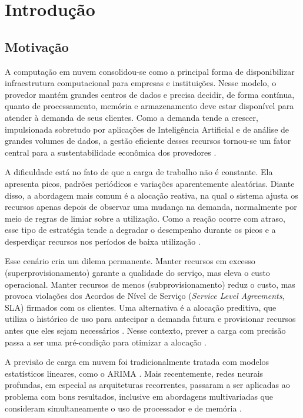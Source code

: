 \chapter{Introdução}
\label{cap:introducao}

\section{Motivação}
\label{sec:motivacao}

A computação em nuvem consolidou-se como a principal forma de disponibilizar infraestrutura computacional para empresas e instituições. Nesse modelo, o provedor mantém grandes centros de dados e precisa decidir, de forma contínua, quanto de processamento, memória e armazenamento deve estar disponível para atender à demanda de seus clientes. Como a demanda tende a crescer, impulsionada sobretudo por aplicações de Inteligência Artificial e de análise de grandes volumes de dados, a gestão eficiente desses recursos tornou-se um fator central para a sustentabilidade econômica dos provedores \cite{rossi2023forecasting}.

A dificuldade está no fato de que a carga de trabalho não é constante. Ela apresenta picos, padrões periódicos e variações aparentemente aleatórias. Diante disso, a abordagem mais comum é a alocação reativa, na qual o sistema ajusta os recursos apenas depois de observar uma mudança na demanda, normalmente por meio de regras de limiar sobre a utilização. Como a reação ocorre com atraso, esse tipo de estratégia tende a degradar o desempenho durante os picos e a desperdiçar recursos nos períodos de baixa utilização \cite{bodra2025ml}.

Esse cenário cria um dilema permanente. Manter recursos em excesso (superprovisionamento) garante a qualidade do serviço, mas eleva o custo operacional. Manter recursos de menos (subprovisionamento) reduz o custo, mas provoca violações dos Acordos de Nível de Serviço (\textit{Service Level Agreements}, SLA) firmados com os clientes. Uma alternativa é a alocação preditiva, que utiliza o histórico de uso para antecipar a demanda futura e provisionar recursos antes que eles sejam necessários \cite{bodra2025ml}. Nesse contexto, prever a carga com precisão passa a ser uma pré-condição para otimizar a alocação \cite{rossi2023forecasting}.

A previsão de carga em nuvem foi tradicionalmente tratada com modelos estatísticos lineares, como o ARIMA \cite{calheiros2015arima}. Mais recentemente, redes neurais profundas, em especial as arquiteturas recorrentes, passaram a ser aplicadas ao problema com bons resultados, inclusive em abordagens multivariadas que consideram simultaneamente o uso de processador e de memória \cite{xu2022esdnn}.

